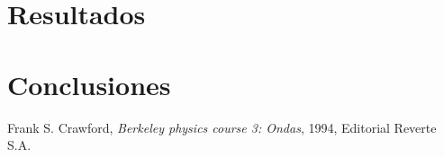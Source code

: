 \documentclass[11pt,a4paper]{article}
\begin{document}
\section{Resultados}
\label{sec:discusion}




\section{Conclusiones}
\label{sec:conclusiones}








\begin{thebibliography}{1}
  Frank S. Crawford, \textit{Berkeley physics course 3: Ondas}, 1994, Editorial Reverte S.A.
\end{thebibliography}
 
\end{document}
